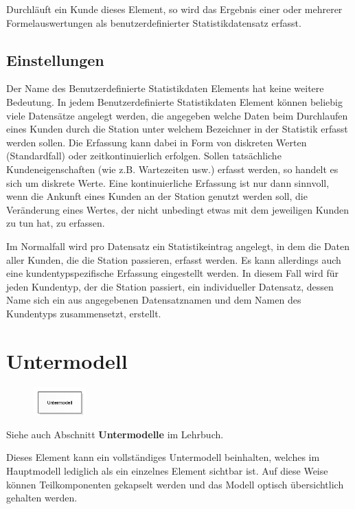 Durchläuft ein Kunde dieses Element, so wird das Ergebnis einer oder mehrerer Formelauswertungen
als benutzerdefinierter Statistikdatensatz erfasst.

\subsection*{Einstellungen}

Der Name des Benutzerdefinierte Statistikdaten Elements hat keine weitere Bedeutung.
In jedem Benutzerdefinierte Statistikdaten Element können beliebig viele Datensätze
angelegt werden, die angegeben welche Daten beim Durchlaufen eines Kunden durch die
Station unter welchem Bezeichner in der Statistik erfasst werden sollen. Die Erfassung
kann dabei in Form von diskreten Werten (Standardfall) oder zeitkontinuierlich
erfolgen. Sollen tatsächliche Kundeneigenschaften (wie z.B. Wartezeiten usw.) erfasst
werden, so handelt es sich um diskrete Werte. Eine kontinuierliche Erfassung ist nur
dann sinnvoll, wenn die Ankunft eines Kunden an der Station genutzt werden soll,
die Veränderung eines Wertes, der nicht unbedingt etwas mit dem jeweiligen Kunden
zu tun hat, zu erfassen.

Im Normalfall wird pro Datensatz ein Statistikeintrag angelegt, in dem die Daten
aller Kunden, die die Station passieren, erfasst werden. Es kann allerdings auch
eine kundentypspezifische Erfassung eingestellt werden. In diesem Fall wird für
jeden Kundentyp, der die Station passiert, ein individueller Datensatz, dessen
Name sich ein aus angegebenen Datensatznamen und dem Namen des Kundentyps
zusammensetzt, erstellt.


\section{Untermodell}
\label{ref:ModelElementSub}

\begin{figure}
\vspace{-22pt}
\includegraphics[width=2cm]{imageModelElementSub.png}
\vspace{-22pt}
\end{figure}

Siehe auch Abschnitt \textbf{Untermodelle} im Lehrbuch.

Dieses Element kann ein vollständiges Untermodell beinhalten, welches im Hauptmodell
lediglich als ein einzelnes Element sichtbar ist. Auf diese Weise können Teilkomponenten
gekapselt werden und das Modell optisch übersichtlich gehalten werden.


